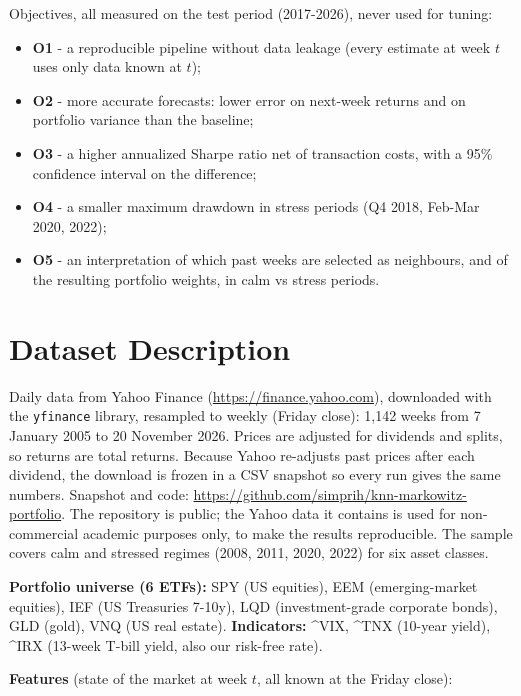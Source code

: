 \documentclass[11pt,a4paper]{article}
\newcommand{\changed}[1]{#1}
\begin{document}
Objectives, all measured on the test period (2017-2026), never used for tuning:
\begin{itemize}
\item \textbf{O1} - a reproducible pipeline without data leakage (every estimate at week $t$ uses only data known at $t$);
\item \textbf{O2} - more accurate forecasts: lower error on next-week returns and on portfolio variance than the baseline;
\item \textbf{O3} - a higher annualized Sharpe ratio net of transaction costs\changed{, with a 95\% confidence interval on the difference};
\item \textbf{O4} - a smaller maximum drawdown in stress periods (Q4 2018, Feb-Mar 2020, 2022);
\item \textbf{O5} - an interpretation of which past weeks are selected as neighbours, and of the resulting portfolio weights, in calm vs stress periods.
\end{itemize}

\section{Dataset Description}
Daily data from Yahoo Finance (\url{https://finance.yahoo.com}), downloaded with the \texttt{yfinance} library, resampled
to weekly (Friday close): 1{,}142 weeks from 7 January 2005 to 20 November 2026. Prices are adjusted for dividends
and splits, so returns are total returns. Because Yahoo re-adjusts past prices after each dividend, the download is
frozen in a CSV snapshot so every run gives the same numbers. \changed{Snapshot and code: \url{https://github.com/simprih/knn-markowitz-portfolio}. The repository is public; the Yahoo data it contains is used for non-commercial academic purposes only, to make the results reproducible. The sample covers calm and stressed regimes (2008, 2011, 2020, 2022) for six asset classes.}

\textbf{Portfolio universe (6 ETFs):} SPY (US equities), EEM (emerging-market equities), IEF (US Treasuries 7-10y),
LQD (investment-grade corporate bonds), GLD (gold), VNQ (US real estate). \textbf{Indicators:} \^{}VIX, \^{}TNX (10-year yield),
\^{}IRX (13-week T-bill yield, also our risk-free rate).

\textbf{Features} \changed{(state of the market at week $t$, all known at the Friday close):}
\end{document}
